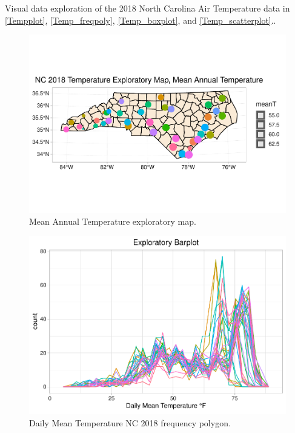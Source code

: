 \documentclass[12pt,]{article}
\begin{document}
Visual data exploration of the 2018 North Carolina Air Temperature data
in \autoref{Tempplot}, \autoref{Temp_freqpoly}, \autoref{Temp_boxplot},
and \autoref{Temp_scatterplot}..

\begin{figure}
\centering
\includegraphics{./Outputunnamed-chunk-29-1.pdf}
\caption{Mean Annual Temperature exploratory map. \label{Tempplot}}
\end{figure}

\begin{figure}
\centering
\includegraphics{./Outputunnamed-chunk-30-1.pdf}
\caption{Daily Mean Temperature NC 2018 frequency polygon.
\label{Temp_freqpoly}}
\end{figure}
\end{document}
